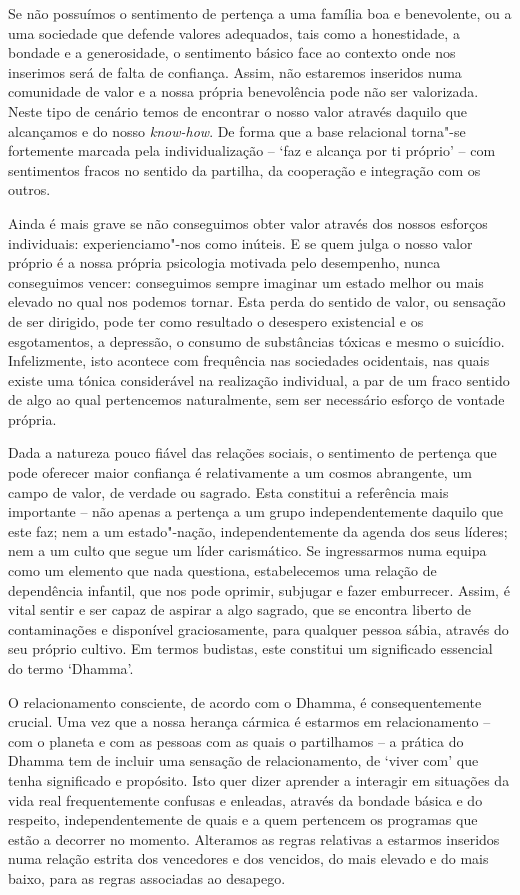 Se não possuímos o sentimento de pertença a uma família boa e benevolente, ou a
uma sociedade que defende valores adequados, tais como a honestidade, a bondade
e a generosidade, o sentimento básico face ao contexto onde nos inserimos será
de falta de confiança. Assim, não estaremos inseridos numa comunidade de valor e
a nossa própria benevolência pode não ser valorizada. Neste tipo de cenário
temos de encontrar o nosso valor através daquilo que alcançamos e do nosso
\emph{know-how}. De forma que a base relacional torna"-se fortemente marcada
pela individualização -- `faz e alcança por ti próprio' -- com sentimentos
fracos no sentido da partilha, da cooperação e integração com os outros.

Ainda é mais grave se não conseguimos obter valor através dos nossos esforços
individuais: experienciamo"-nos como inúteis. E se quem julga o nosso valor
próprio é a nossa própria psicologia motivada pelo desempenho, nunca conseguimos
vencer: conseguimos sempre imaginar um estado melhor ou mais elevado no qual nos
podemos tornar. Esta perda do sentido de valor, ou sensação de ser dirigido,
pode ter como resultado o desespero existencial e os esgotamentos, a depressão,
o consumo de substâncias tóxicas e mesmo o suicídio. Infelizmente, isto acontece
com frequência nas sociedades ocidentais, nas quais existe uma tónica
considerável na realização individual, a par de um fraco sentido de algo ao qual
pertencemos naturalmente, sem ser necessário esforço de vontade própria.

Dada a natureza pouco fiável das relações sociais, o sentimento de pertença que
pode oferecer maior confiança é relativamente a um cosmos abrangente, um campo
de valor, de verdade ou sagrado. Esta constitui a referência mais importante --
não apenas a pertença a um grupo independentemente daquilo que este faz; nem a
um estado"-nação, independentemente da agenda dos seus líderes; nem a um culto
que segue um líder carismático. Se ingressarmos numa equipa como um elemento que
nada questiona, estabelecemos uma relação de dependência infantil, que nos pode
oprimir, subjugar e fazer emburrecer. Assim, é vital sentir e ser capaz de
aspirar a algo sagrado, que se encontra liberto de contaminações e disponível
graciosamente, para qualquer pessoa sábia, através do seu próprio cultivo. Em
termos budistas, este constitui um significado essencial do termo `Dhamma'.

O relacionamento consciente, de acordo com o Dhamma, é consequentemente crucial.
Uma vez que a nossa herança cármica é estarmos em relacionamento -- com o
planeta e com as pessoas com as quais o partilhamos -- a prática do Dhamma tem
de incluir uma sensação de relacionamento, de `viver com' que tenha significado
e propósito. Isto quer dizer aprender a interagir em situações da vida real
frequentemente confusas e enleadas, através da bondade básica e do respeito,
independentemente de quais e a quem pertencem os programas que estão a decorrer
no momento. Alteramos as regras relativas a estarmos inseridos numa relação
estrita dos vencedores e dos vencidos, do mais elevado e do mais baixo, para as
regras associadas ao desapego. 


